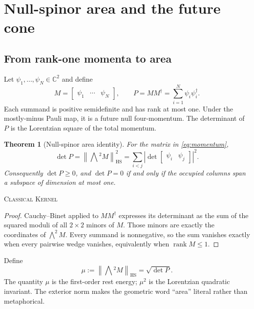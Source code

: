 \documentclass[11pt]{article}
\newcommand{\Kernel}{\textcolor{kernelcolor}{\textsc{Kernel}}}
\newcommand{\Classical}{\textcolor{classicalcolor}{\textsc{Classical}}}
\newcommand{\rank}{\operatorname{rank}}
\newcommand{\C}{\mathbb{C}}
\newcommand{\norm}[1]{\left\lVert #1\right\rVert}
\newtheorem{theorem}{Theorem}[section]
\begin{document}
\section{Null-spinor area and the future cone}

\subsection{From rank-one momenta to area}

Let $\psi_1,\ldots,\psi_N\in\C^2$ and define
\begin{equation}\label{eq:momentum}
 M=\begin{bmatrix}\psi_1&\cdots&\psi_N\end{bmatrix},
 \qquad
 P=MM^\dagger=\sum_{i=1}^N\psi_i\psi_i^\dagger.
\end{equation}
Each summand is positive semidefinite and has rank at most one.  Under the
mostly-minus Pauli map, it is a future null four-momentum.  The determinant of
$P$ is the Lorentzian square of the total momentum.

\begin{theorem}[Null-spinor area identity]\label{thm:area}
For the matrix in \eqref{eq:momentum},
\begin{equation}\label{eq:area}
 \det P
 =\norm{\bigwedge{}^2 M}_{\mathrm{HS}}^2
 =\sum_{i<j}\left|\det\begin{bmatrix}\psi_i&\psi_j\end{bmatrix}\right|^2.
\end{equation}
Consequently $\det P\geq0$, and $\det P=0$ if and only if the occupied columns
span a subspace of dimension at most one.
\end{theorem}
\noindent\Classical{} \Kernel{}

\begin{proof}
Cauchy--Binet applied to $MM^\dagger$ expresses its determinant as the sum of
the squared moduli of all $2\times2$ minors of $M$.  Those minors are exactly
the coordinates of $\bigwedge^2M$.  Every summand is nonnegative, so the sum
vanishes exactly when every pairwise wedge vanishes, equivalently when
$\rank M\leq1$.
\end{proof}

Define
\begin{equation}\label{eq:mu}
 \mu:=\norm{\bigwedge{}^2M}_{\mathrm{HS}}=\sqrt{\det P}.
\end{equation}
The quantity $\mu$ is the first-order rest energy; $\mu^2$ is the Lorentzian
quadratic invariant.  The exterior norm makes the geometric word ``area''
literal rather than metaphorical.
\end{document}
